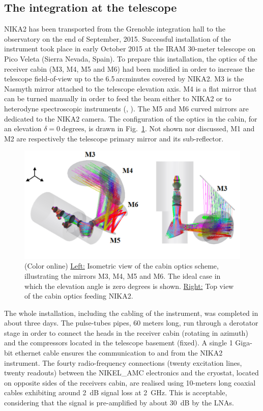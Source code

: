 \documentclass[]{aa} %
\begin{document}
\subsection{The integration at the telescope}
\label{The integration at the telescope}

NIKA2 has been transported from the Grenoble integration hall to the observatory on the end of September, 2015. Successful installation of the instrument took place in early October 2015 at the IRAM 30-meter telescope on Pico Veleta (Sierra Nevada, Spain). To prepare this installation, the optics of the receiver cabin (M3, M4, M5 and M6) had been modified in order to increase the telescope field-of-view up to the 6.5\,arcminutes covered by NIKA2. M3 is the Nasmyth mirror attached to the telescope elevation axis. M4 is a flat mirror that can be turned manually in order to feed the beam either to NIKA2 or to heterodyne spectroscopic instruments (\cite{Carter2012}, \cite{Schuster2004}). The M5 and M6 curved mirrors are dedicated to the NIKA2 camera. The configuration of the optics in the cabin, for an elevation $\delta = 0~\textrm{degrees}$, is drawn in Fig.~\ref{figCabin}. Not shown nor discussed, M1 and M2 are respectively the telescope primary mirror and its sub-reflector. 

\begin{figure}[h]
   \centering
    \includegraphics[width=.85\linewidth]{figCabin.png}
      \caption{(Color online) \underline{Left:} Isometric view of the cabin optics scheme, illustrating the mirrors M3, M4, M5 and M6. The ideal case in which the elevation angle is zero degrees is shown. \underline{Right:} Top view of the cabin optics feeding NIKA2.}
         \label{figCabin}
\end{figure}

The whole installation, including the cabling of the instrument, was completed in about three days. The pulse-tubes pipes, 60 meters long, run through a derotator stage in order to connect the heads in the receiver cabin (rotating in azimuth) and the compressors located in the telescope basement (fixed). A single 1 Giga-bit ethernet cable ensures the communication to and from the NIKA2 instrument. The fourty radio-frequency connections (twenty excitation lines, twenty readouts) between the NIKEL\_AMC electronics and the cryostat, located on opposite sides of the receivers cabin, are realised using 10-meters long coaxial cables exhibiting around 2~dB signal loss at 2~GHz. This is acceptable, considering that the signal is pre-amplified by about 30~dB by the LNAs. 
\end{document}
